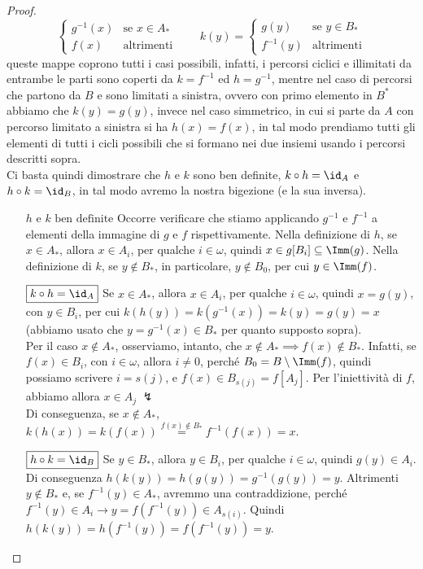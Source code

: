 \documentclass[11pt]{scrartcl}
\begin{document}
\begin{proof}
\[\begin{cases}
		g^{-1}(x) &\text{se $x \in A_*$}\\
		f(x) &\text{altrimenti}
	\end{cases}
	\qquad
	k(y) = \begin{cases}
		g(y) &\text{se $y \in B_*$}\\
		f^{-1}(y) &\text{altrimenti}
	\end{cases}
		\]
	queste mappe coprono tutti i casi  possibili, infatti, i percorsi ciclici e illimitati da entrambe le parti sono coperti da $k = f^{-1}$ ed $h = g^{-1}$, mentre nel caso di percorsi che partono da $B$ e sono limitati a sinistra, ovvero con primo elemento in $B^*$ abbiamo che $k(y) = g(y)$, invece nel caso simmetrico, 
	in cui si parte da $A$ con percorso limitato a sinistra si ha $h(x) = f(x)$, in tal modo prendiamo tutti gli elementi di tutti i cicli possibili che si formano nei due insiemi usando i percorsi descritti sopra.\\
	Ci basta quindi dimostrare che $h$ e $k$ sono ben definite, $k \circ h = \id_A$ e $h \circ k = \id_B$, in tal modo avremo la nostra bigezione (e la sua inversa).
	\begin{itemize}
		\item[$\boxed{\text{$h$ e $k$ ben definite}}$] Occorre verificare che stiamo applicando $g^{-1}$ e $f^{-1}$ a elementi della immagine di $g$ e $f$ rispettivamente.
		Nella definizione di $h$, se $x \in A_*$, allora $x \in A_i$, per qualche $i \in \omega$, quindi $x \in g[B_i] \subseteq \Imm(g)$. Nella definizione di $k$, se $y \not \in B_*$, in particolare,
		$y \not \in B_0$, per cui $y \in \Imm(f)$.
		\item[$\boxed{k \circ h = \id_A}$] Se $x \in A_*$, allora $x \in A_i$, per qualche $i \in \omega$, quindi $x = g(y)$, con $y \in B_i$, per cui $k(h(y)) = k(g^{-1}(x)) = k(y) = g(y) = x$ (abbiamo usato che $y = g^{-1}(x) \in B_*$ per quanto supposto sopra).\\
		Per il caso $x \not \in A_*$, osserviamo, intanto, che $x \not \in A_* \implies f(x) \not \in B_*$. Infatti, se $f(x) \in B_i$, con $i \in \omega$, allora $i \ne 0$, perché $B_0 = B \setminus \Imm(f)$, quindi possiamo scrivere $i = s(j)$, 
		e $f(x) \in B_{s(j)} = f[A_j]$. Per l'iniettività di $f$, abbiamo allora $x \in A_j \;\lightning$\\
		Di conseguenza, se $x \not \in A_*$, $k(h(x)) = k(f(x)) \overset{f(x) \not \in B_*}{=} f^{-1}(f(x)) = x$.
		\item[$\boxed{h \circ k = \id_B}$] Se $y \in B_*$, allora $y \in B_i$, per qualche $i \in \omega$, quindi $g(y) \in A_i$. Di conseguenza $h(k(y)) = h(g(y)) = g^{-1}(g(y)) = y$. Altrimenti $y \not \in B_*$ e, se $f^{-1}(y)\in A_*$, avremmo una contraddizione,
		perché $f^{-1}(y) \in A_i \rightarrow y = f(f^{-1}(y)) \in A_{s(i)}$. Quindi $h(k(y)) = h(f^{-1}(y)) = f(f^{-1}(y)) = y$.
	\end{itemize}
\end{proof}
\end{document}
